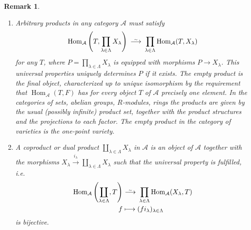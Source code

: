 \documentclass[DIV=14,parskip=full,pointednumbers]{scrartcl}
\newenvironment{alphanumerate}{\begin{enumerate}[label={$(\alph*)$},ref=\curthm]}{\end{enumerate}}
\theoremstyle{cthm}
\theoremstyle{cvarthm}
\theoremstyle{cdef}
\newtheorem*{rem*}{Remark}
\newcommand{\Aa}{\mathcal{A}}
\newcommand{\Hom}{\operatorname{Hom}}
\newcommand{\longto}{\longrightarrow}
\newcommand{\isomorphism}{
	\tikz[baseline=(a.base)] \node (a) at (0,0) {$\longrightarrow$} node[above=-0.25ex] {\tiny $\sim$};}
\newcommand{\morphism}[1][]{\overset{#1}{\longto}}
\begin{document}
	\begin{rem*}
		\begin{alphanumerate}
		\item 
			Arbitrary products in any category $\Aa$ must satisfy \begin{align*}
				\Hom_\Aa\left(T, \prod_{\lambda\in \Lambda} X_\lambda\right) \isomorphism \prod_{\lambda\in\Lambda} \Hom_\Aa(T,X_\lambda)
			\end{align*} for any $T$, where $P=\prod_{\lambda\in\Lambda} X_\lambda$ is equipped with morphisms $P\to X_\lambda$. This universal properties uniquely determines $P$ if it exists. The empty product is the \emph{final object}, characterized up to unique isomorphism by the requirement that $\Hom_\Aa(T,F)$ has for every object $T$ of $\Aa$ precisely one element. In the categories of sets, abelian groups, $R$-modules, rings the products are given by the usual (possibly infinite) product set, together with the product structures and the projections to each factor. The empty product in the category of varieties is the one-point variety.
		\item 
			A \emph{coproduct} or \emph{dual product} $\coprod_{\lambda\in \Lambda} X_\lambda$ in $\Aa$ is an object of $\Aa$ together with the morphisms $X_\lambda \morphism[i_\lambda] \coprod_{\lambda\in\Lambda} X_\lambda$ such that the universal property is fulfilled, i.e. 
			\begin{align*}
				\Hom_\Aa\left(\coprod_{\lambda\in\Lambda} , T\right) &\isomorphism \prod_{\lambda\in\Lambda} \Hom_\Aa(X_\lambda, T)\\
				f &\longmapsto (fi_\lambda)_{\lambda\in\Lambda}
			\end{align*}
			is bijective. 
			

\end{alphanumerate}
\end{rem*}
\end{document}

